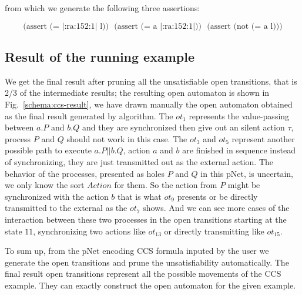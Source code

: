 \documentclass{lncs/llncs}
\newcommand{\TODO}[1]{\textcolor{red}{\textbf{[TODO:#1]}}}
\begin{document}
from which we generate the following three assertions:

\[\text{(assert\ (=\ |:ra:152:1|\ l))}\ \ \ \text{(assert\ (=\ a\ |:ra:152:1|))}\ \ \ \text{(assert\ (not\ (=\ a\ l)))}\]

\subsection{Result of the running example}
\label{section:full-result}

We get the final result after pruning all the unsatisfiable open
transitions, that is 2/3 of the intermediate results; the resulting open
automaton is shown in Fig.~\ref{schema:ccs-result}, we have drawn
manually the open automaton obtained as the final result generated by
algorithm.
The $ot_1$ represents the
value-passing between $a.P$ and $b.Q$ and they are synchronized then
give out an silent action $\tau$, process $P$ and $Q$ should not work
in this case. The $ot_3$ and $ot_5$ represent another possible path to
execute $a.P||b.Q$, action $a$ and $b$ are finished in sequence
instead of synchronizing, they are just transmitted out as the
external action. The behavior of the processes, presented as holes $P$
and $Q$ in this pNet, is uncertain, we only know the sort $Action$ for
them. So the action from $P$ might be synchronized with the action $b$
that is what $ot_9$ presents or be directly transmitted to the
external as the $ot_7$ shows. And we can see more cases of the
interaction between these two processes in the open transitions starting at
the state $11$, synchronizing two actions like $ot_{13}$ or directly
transmitting like $ot_{15}$. 

To sum up, from the pNet encoding CCS formula inputed by the user we
generate the open transitions and prune the unsatisfiability
automatically. The final result open transitions represent all the
possible movements of the CCS example. They can exactly construct the
open automaton for the given example.
\end{document}
